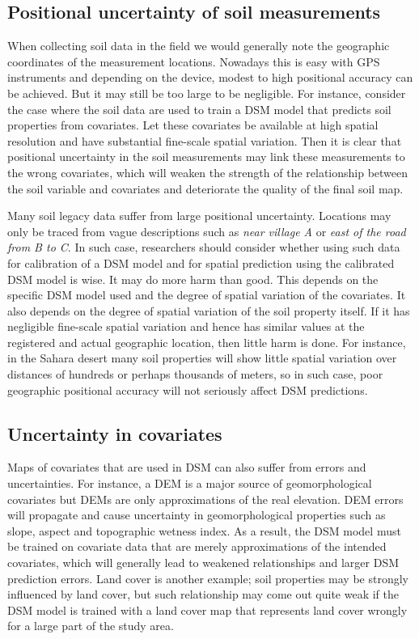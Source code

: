 \documentclass[10pt,b5paper,]{book}
\theoremstyle{definition}
\theoremstyle{definition}
\theoremstyle{definition}
\theoremstyle{remark}
\begin{document}
\hypertarget{positional-uncertainty-of-soil-measurements}{%
\subsection{Positional uncertainty of soil
measurements}\label{positional-uncertainty-of-soil-measurements}}

When collecting soil data in the field we would generally note the
geographic coordinates of the measurement locations. Nowadays this is
easy with GPS instruments and depending on the device, modest to high
positional accuracy can be achieved. But it may still be too large to be
negligible. For instance, consider the case where the soil data are used
to train a DSM model that predicts soil properties from covariates. Let
these covariates be available at high spatial resolution and have
substantial fine-scale spatial variation. Then it is clear that
positional uncertainty in the soil measurements may link these
measurements to the wrong covariates, which will weaken the strength of
the relationship between the soil variable and covariates and
deteriorate the quality of the final soil map.

Many soil legacy data suffer from large positional uncertainty.
Locations may only be traced from vague descriptions such as \emph{near
village A} or \emph{east of the road from B to C}. In such case,
researchers should consider whether using such data for calibration of a
DSM model and for spatial prediction using the calibrated DSM model is
wise. It may do more harm than good. This depends on the specific DSM
model used and the degree of spatial variation of the covariates. It
also depends on the degree of spatial variation of the soil property
itself. If it has negligible fine-scale spatial variation and hence has
similar values at the registered and actual geographic location, then
little harm is done. For instance, in the Sahara desert many soil
properties will show little spatial variation over distances of hundreds
or perhaps thousands of meters, so in such case, poor geographic
positional accuracy will not seriously affect DSM predictions.

\hypertarget{uncertainty-in-covariates}{%
\subsection{Uncertainty in covariates}\label{uncertainty-in-covariates}}

Maps of covariates that are used in DSM can also suffer from errors and
uncertainties. For instance, a DEM is a major source of geomorphological
covariates but DEMs are only approximations of the real elevation. DEM
errors will propagate and cause uncertainty in geomorphological
properties such as slope, aspect and topographic wetness index. As a
result, the DSM model must be trained on covariate data that are merely
approximations of the intended covariates, which will generally lead to
weakened relationships and larger DSM prediction errors. Land cover is
another example; soil properties may be strongly influenced by land
cover, but such relationship may come out quite weak if the DSM model is
trained with a land cover map that represents land cover wrongly for a
large part of the study area.
\end{document}
